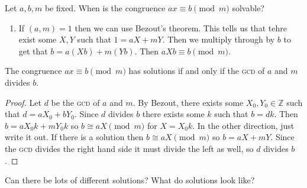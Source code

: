 \begin{problem}
Let $a,b,m$ be fixed.
When is the congruence $ax \equiv b \pmod{m}$ solvable?
\end{problem}

\begin{enumerate}[label=\textbf{Obs. \arabic*.}]
\item If $(a,m)=1$ then we can use Bezout's theorem. This tells us that tehre exist some $X,Y$ such that $1 = aX + mY$. Then we multiply through by $b$ to get that $b = a(Xb) + m(Yb)$. Then $aXb \equiv b \pmod{m}$.
\end{enumerate}

\begin{lemma}
The congruence $ax \equiv b \pmod{m}$ has solutions if and only if the \textsc{gcd} of $a$ and $m$ divides $b$.
\end{lemma}

\begin{proof}
Let $d$ be the \textsc{gcd} of $a$ and $m$. By Bezout, there exists some $X_0, Y_0 \in \mathbb{Z}$ such that $d = aX_0 + bY_0$. Since $d$ divides $b$ there exists some $k$ such that $b = dk$. Then $b = aX_0k + mY_0k$ so $b \cong aX \pmod{m}$ for $X = X_0k$. In the other direction, just write it out. If there is a solution then $b \cong aX \pmod{m}$ so $b = aX + mY$. Since the \textsc{gcd} divides the right hand side it must divide the left as well, so $d$ divides $b$.
\end{proof}

\begin{problem}
Can there be lots of different solutions? What do solutions look like?
\end{problem}